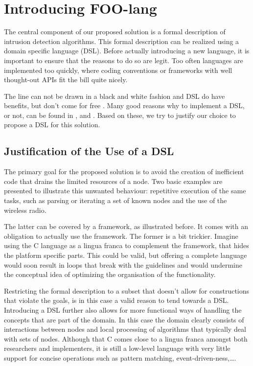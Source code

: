 \documentclass[conference]{IEEEtran}
\begin{document}
\section{Introducing FOO-lang}
\label{section:foo-lang}

The central component of our proposed solution is a formal description of
intrusion detection algorithms. This formal description can be realized using a
domain specific language (DSL). Before actually introducing a new language, it
is important to ensure that the reasons to do so are legit. Too often languages
are implemented too quickly, where coding conventions or frameworks with well
thought-out APIs fit the bill quite nicely.

The line can not be drawn in a black and white fashion and DSL do have
benefits, but don't come for free \cite{mernik2005and}. Many good reasons why
to implement a DSL, or not, can be found in \cite{mernik2005and},
\cite{van2000domain} and \cite{fowler2010domain}. Based on these, we try to
justify our choice to propose a DSL for this solution.

\subsection{Justification of the Use of a DSL}
\label{subsection:justification}

The primary goal for the proposed solution is to avoid the creation of
inefficient code that drains the limited resources of a node. Two basic
examples are presented to illustrate this unwanted behaviour: repetitive
execution of the same tasks, such as parsing or iterating a set of known nodes
and the use of the wireless radio.

The latter can be covered by a framework, as illustrated before. It comes with
an obligation to actually use the framework. The former is a bit trickier.
Imagine using the C language as a lingua franca to complement the framework,
that hides the platform specific parts. This could be valid, but offering a
complete language would soon result in loops that break with the guidelines and
would undermine the conceptual idea of optimizing the organisation of the
functionality.

Restricting the formal description to a subset that doesn't allow for
constructions that violate the goals, is in this case a valid reason to tend
towards a DSL. Introducing a DSL further also allows for more functional ways
of handling the concepts that are part of the domain. In this case the domain
clearly consists of interactions between nodes and local processing of
algorithms that typically deal with sets of nodes. Although that C comes close
to a lingua franca amongst both researchers and implementers, it is still a
low-level language with very little support for concise operations such as
pattern matching, event-driven-ness,\dots.
\end{document}

